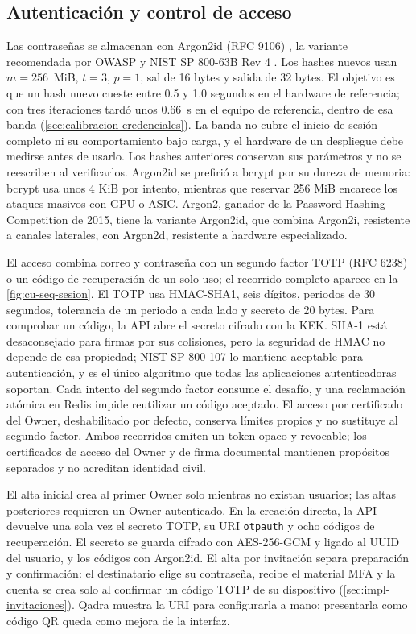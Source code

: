 \subsection{Autenticación y control de acceso}\label{sec:autenticacion}

Las contraseñas se almacenan con Argon2id (RFC 9106) \cite{biryukov2015,biryukov2021}, la variante recomendada por OWASP \cite{owasp_pwstorage2024} y NIST SP 800-63B Rev 4 \cite{nist2024}. Los hashes nuevos usan $m = 256$~MiB, $t = 3$, $p = 1$, sal de 16 bytes y salida de 32 bytes. El objetivo es que un hash nuevo cueste entre 0.5 y 1.0 segundos en el hardware de referencia; con tres iteraciones tardó unos 0.66~s en el equipo de referencia, dentro de esa banda (\cref{sec:calibracion-credenciales}). La banda no cubre el inicio de sesión completo ni su comportamiento bajo carga, y el hardware de un despliegue debe medirse antes de usarlo. Los hashes anteriores conservan sus parámetros y no se reescriben al verificarlos. Argon2id se prefirió a bcrypt por su dureza de memoria: bcrypt usa unos 4 KiB por intento, mientras que reservar 256 MiB encarece los ataques masivos con GPU o ASIC. Argon2, ganador de la Password Hashing Competition de 2015, tiene la variante Argon2id, que combina Argon2i, resistente a canales laterales, con Argon2d, resistente a hardware especializado.

El acceso combina correo y contraseña con un segundo factor TOTP (RFC 6238) \cite{mraihi2011} o un código de recuperación de un solo uso; el recorrido completo aparece en la \cref{fig:cu-seq-sesion}. El TOTP usa HMAC-SHA1, seis dígitos, periodos de 30 segundos, tolerancia de un periodo a cada lado y secreto de 20 bytes. Para comprobar un código, la API abre el secreto cifrado con la KEK. SHA-1 está desaconsejado para firmas por sus colisiones, pero la seguridad de HMAC no depende de esa propiedad; NIST SP 800-107 \cite{dang2012} lo mantiene aceptable para autenticación, y es el único algoritmo que todas las aplicaciones autenticadoras soportan. Cada intento del segundo factor consume el desafío, y una reclamación atómica en Redis impide reutilizar un código aceptado. El acceso por certificado del Owner, deshabilitado por defecto, conserva límites propios y no sustituye al segundo factor. Ambos recorridos emiten un token opaco y revocable; los certificados de acceso del Owner y de firma documental mantienen propósitos separados y no acreditan identidad civil.

El alta inicial crea al primer Owner solo mientras no existan usuarios; las altas posteriores requieren un Owner autenticado. En la creación directa, la API devuelve una sola vez el secreto TOTP, su URI \texttt{otpauth} y ocho códigos de recuperación. El secreto se guarda cifrado con AES-256-GCM y ligado al UUID del usuario, y los códigos con Argon2id. El alta por invitación separa preparación y confirmación: el destinatario elige su contraseña, recibe el material MFA y la cuenta se crea solo al confirmar un código TOTP de su dispositivo (\cref{sec:impl-invitaciones}). Qadra muestra la URI para configurarla a mano; presentarla como código QR queda como mejora de la interfaz.

